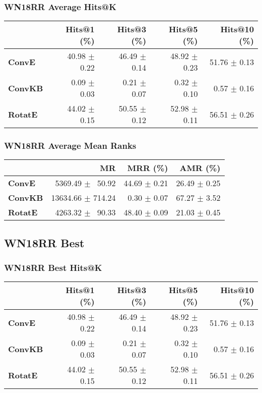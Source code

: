 \documentclass{article}
\begin{document}
\subsubsection{WN18RR Average Hits@K}
    \begin{center}
    \begin{tabular}{lrrrr}
\toprule
{} &   Hits@1 (\%) &   Hits@3 (\%) &   Hits@5 (\%) &  Hits@10 (\%) \\
\midrule
\textbf{ConvE } &  40.98 $\pm$ 0.22 &  46.49 $\pm$ 0.14 &  48.92 $\pm$ 0.23 &  51.76 $\pm$ 0.13 \\
\textbf{ConvKB} &  $\phantom{5}$0.09 $\pm$ 0.03 &  $\phantom{5}$0.21 $\pm$ 0.07 &  $\phantom{5}$0.32 $\pm$ 0.10 &  $\phantom{5}$0.57 $\pm$ 0.16 \\
\textbf{RotatE} &  44.02 $\pm$ 0.15 &  50.55 $\pm$ 0.12 &  52.98 $\pm$ 0.11 &  56.51 $\pm$ 0.26 \\
\bottomrule
\end{tabular}

    \end{center}
\subsubsection{WN18RR Average Mean Ranks}
    \begin{center}
    \begin{tabular}{lrrr}
\toprule
{} &                 MR &      MRR (\%) &      AMR (\%) \\
\midrule
\textbf{ConvE } &  $\phantom{5}$5369.49 $\pm$ $\phantom{5}$50.92 &  44.69 $\pm$ 0.21 &  26.49 $\pm$ 0.25 \\
\textbf{ConvKB} &  13634.66 $\pm$ 714.24 &  $\phantom{5}$0.30 $\pm$ 0.07 &  67.27 $\pm$ 3.52 \\
\textbf{RotatE} &  $\phantom{5}$4263.32 $\pm$ $\phantom{5}$90.33 &  48.40 $\pm$ 0.09 &  21.03 $\pm$ 0.45 \\
\bottomrule
\end{tabular}

    \end{center}
\subsection{WN18RR Best}
\subsubsection{WN18RR Best Hits@K}
    \begin{center}
    \begin{tabular}{lrrrr}
\toprule
{} &   Hits@1 (\%) &   Hits@3 (\%) &   Hits@5 (\%) &  Hits@10 (\%) \\
\midrule
\textbf{ConvE } &  40.98 $\pm$ 0.22 &  46.49 $\pm$ 0.14 &  48.92 $\pm$ 0.23 &  51.76 $\pm$ 0.13 \\
\textbf{ConvKB} &  $\phantom{5}$0.09 $\pm$ 0.03 &  $\phantom{5}$0.21 $\pm$ 0.07 &  $\phantom{5}$0.32 $\pm$ 0.10 &  $\phantom{5}$0.57 $\pm$ 0.16 \\
\textbf{RotatE} &  44.02 $\pm$ 0.15 &  50.55 $\pm$ 0.12 &  52.98 $\pm$ 0.11 &  56.51 $\pm$ 0.26 \\
\bottomrule
\end{tabular}

    \end{center}
\end{document}
